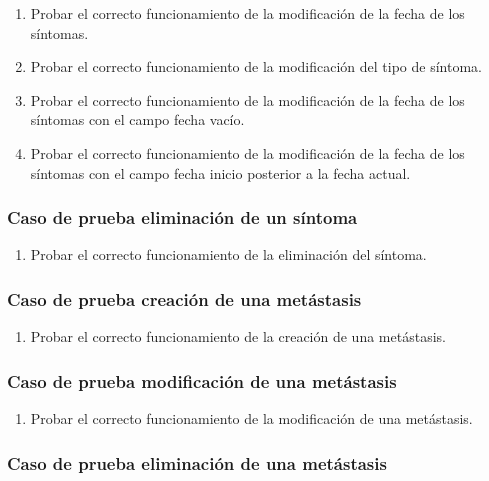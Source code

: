 \begin{enumerate}
    \item Probar el correcto funcionamiento de la modificación de la fecha de los síntomas.
    \item Probar el correcto funcionamiento de la modificación del tipo de síntoma.
    \item Probar el correcto funcionamiento de la modificación de la fecha de los síntomas con el campo fecha vacío.
    \item Probar el correcto funcionamiento de la modificación de la fecha de los síntomas con el campo fecha inicio posterior a la fecha actual.
\end{enumerate}

\subsubsection{Caso de prueba eliminación de un síntoma}

\begin{enumerate}
    \item Probar el correcto funcionamiento de la eliminación del síntoma.
\end{enumerate}

\subsubsection{Caso de prueba creación de una metástasis}

\begin{enumerate}
    \item Probar el correcto funcionamiento de la creación de una metástasis.
\end{enumerate}

\subsubsection{Caso de prueba modificación de una metástasis}

\begin{enumerate}
    \item Probar el correcto funcionamiento de la modificación de una metástasis.
\end{enumerate}

\subsubsection{Caso de prueba eliminación de una metástasis}

